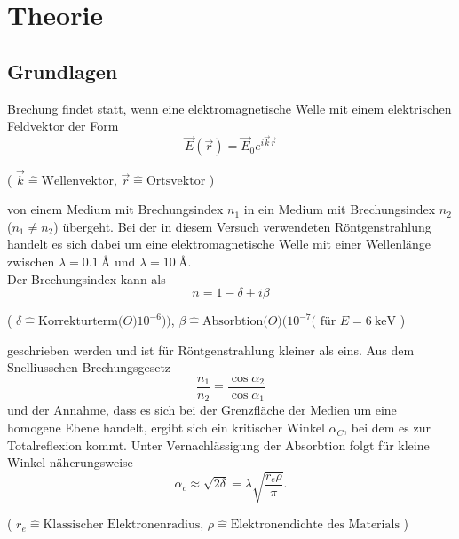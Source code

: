 \section{Theorie}
\subsection{Grundlagen} \label{chap:Grundlagen}
Brechung findet statt, wenn eine elektromagnetische Welle mit einem elektrischen Feldvektor der Form
\begin{equation*}
    \vec{E}(\vec{r}) = \vec{E}_0 e^{i \vec{k} \vec{r} }
\end{equation*}
\begin{center}
    \tiny{( $ \vec{k} \hat{=} \text{Wellenvektor} $, $ \vec{r} \hat{=} \text{Ortsvektor} $ )}
\end{center}
von einem Medium mit Brechungsindex $n_1$ in ein Medium mit Brechungsindex $n_2$ ($n_1 \neq n_2$) übergeht.
Bei der in diesem Versuch verwendeten Röntgenstrahlung handelt es sich dabei um eine elektromagnetische Welle mit einer Wellenlänge zwischen $\lambda = \SI{0,1}{\angstrom}$ und $\lambda = \SI{10}{\angstrom}$. \\
Der Brechungsindex kann als
\begin{equation*}
    n = 1 - \delta + i\beta
\end{equation*}
\begin{center}
    \tiny{( $ \delta \hat{=} \text{Korrekturterm}\mathcal(O)10^{-6})) $, $ \beta \hat{=} \text{Absorbtion}\mathcal(O)(10^{-7} (\text{ für } E = \SI{6}{\kilo \electronvolt}   $ )}
\end{center}
geschrieben werden und ist für Röntgenstrahlung kleiner als eins.
Aus dem Snelliusschen Brechungsgesetz
\begin{equation*}
    \frac{n_1}{n_2} = \frac{\cos{\alpha_2}}{\cos{\alpha_1}}
\end{equation*}
und der Annahme, dass es sich bei der Grenzfläche der Medien um eine homogene Ebene handelt, ergibt sich ein kritischer Winkel $\alpha_C$, bei dem es zur Totalreflexion kommt. Unter Vernachlässigung der Absorbtion folgt für kleine Winkel näherungsweise
\begin{equation}
    \alpha_c \approx \sqrt{2 \delta} = \lambda \sqrt{ \frac{r_e \rho}{\pi} } .
    \label{eqn:alphacrit}
\end{equation}
\begin{center}
    \tiny{( $ r_e \hat{=} \text{Klassischer Elektronenradius} $, $ \rho \hat{=} \text{Elektronendichte des Materials}$ )}
\end{center}

